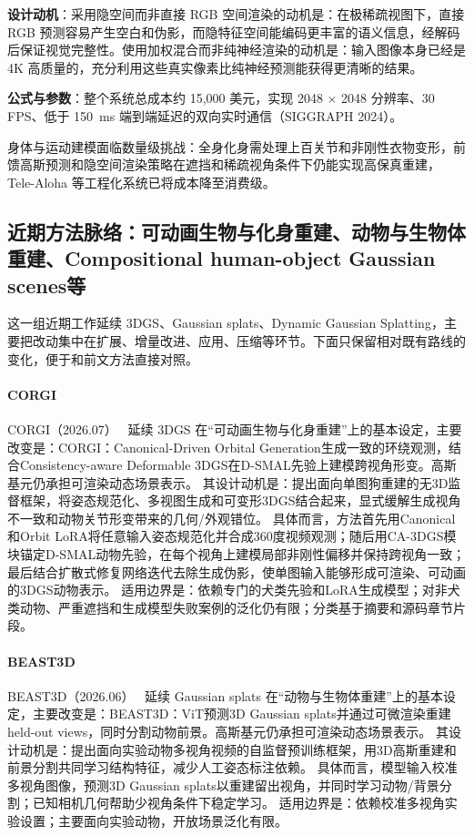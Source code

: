 \textbf{设计动机}：采用隐空间而非直接 RGB 空间渲染的动机是：在极稀疏视图下，直接 RGB 预测容易产生空白和伪影，而隐特征空间能编码更丰富的语义信息，经解码后保证视觉完整性。使用加权混合而非纯神经渲染的动机是：输入图像本身已经是 4K 高质量的，充分利用这些真实像素比纯神经预测能获得更清晰的结果。

\textbf{公式与参数}：整个系统总成本约 15,000 美元，实现 2048 $\times$ 2048 分辨率、30 FPS、低于 150~ms 端到端延迟的双向实时通信（SIGGRAPH 2024）。

\begin{takeaway}
身体与运动建模面临数量级挑战：全身化身需处理上百关节和非刚性衣物变形，前馈高斯预测和隐空间渲染策略在遮挡和稀疏视角条件下仍能实现高保真重建，Tele-Aloha 等工程化系统已将成本降至消费级。
\end{takeaway}


\subsection{近期方法脉络：可动画生物与化身重建、动物与生物体重建、Compositional human-object Gaussian scenes等}

这一组近期工作延续 3DGS、Gaussian splats、Dynamic Gaussian Splatting，主要把改动集中在扩展、增量改进、应用、压缩等环节。下面只保留相对既有路线的变化，便于和前文方法直接对照。

\paragraph{CORGI}
CORGI（2026.07）~\cite{2607_00321} 延续 3DGS 在“可动画生物与化身重建”上的基本设定，主要改变是：CORGI：Canonical-Driven Orbital Generation生成一致的环绕观测，结合Consistency-aware Deformable 3DGS在D-SMAL先验上建模跨视角形变。高斯基元仍承担可渲染动态场景表示。
其设计动机是：提出面向单图狗重建的无3D监督框架，将姿态规范化、多视图生成和可变形3DGS结合起来，显式缓解生成视角不一致和动物关节形变带来的几何/外观错位。
具体而言，方法首先用Canonical和Orbit LoRA将任意输入姿态规范化并合成360度视频观测；随后用CA-3DGS模块锚定D-SMAL动物先验，在每个视角上建模局部非刚性偏移并保持跨视角一致；最后结合扩散式修复网络迭代去除生成伪影，使单图输入能够形成可渲染、可动画的3DGS动物表示。
适用边界是：依赖专门的犬类先验和LoRA生成模型；对非犬类动物、严重遮挡和生成模型失败案例的泛化仍有限；分类基于摘要和源码章节片段。

\paragraph{BEAST3D}
BEAST3D（2026.06）~\cite{2606_02937} 延续 Gaussian splats 在“动物与生物体重建”上的基本设定，主要改变是：BEAST3D：ViT预测3D Gaussian splats并通过可微渲染重建held-out views，同时分割动物前景。高斯基元仍承担可渲染动态场景表示。
其设计动机是：提出面向实验动物多视角视频的自监督预训练框架，用3D高斯重建和前景分割共同学习结构特征，减少人工姿态标注依赖。
具体而言，模型输入校准多视角图像，预测3D Gaussian splats以重建留出视角，并同时学习动物/背景分割；已知相机几何帮助少视角条件下稳定学习。
适用边界是：依赖校准多视角实验设置；主要面向实验动物，开放场景泛化有限。


